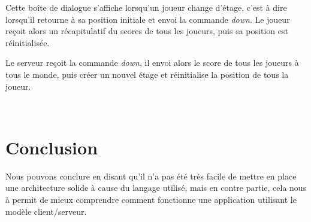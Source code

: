 \documentclass[a4paper,10pt]{article}
\begin{document}
		\begin{minipage}[t]{0.46\textwidth}
			\vspace{2pt}
			Cette boîte de dialogue s'affiche lorsqu'un joueur change d'étage, c'est à dire lorsqu'il retourne à sa position initiale et envoi la commande
\emph{down}. Le joueur reçoit alors un récapitulatif du scores de tous les joueurs, puis sa position est réinitialisée.
		\end{minipage}
		\hfill
		\begin{minipage}[t]{0.46\textwidth}
			\vspace{2pt}
			Le serveur reçoit la commande \emph{down}, il envoi alors le score de tous les joueurs à tous le monde, puis créer un nouvel étage et réinitialise
la position de tous la joueur.
		\end{minipage}\\
		
	\newpage
	\section{Conclusion}

	Nous pouvons conclure en disant qu'il n'a pas été très facile de mettre en place une architecture solide à cause du langage utilisé, mais en contre partie,
cela nous à permit de mieux comprendre comment fonctionne une application utilisant le modèle client/serveur.
	
	
\end{document}
